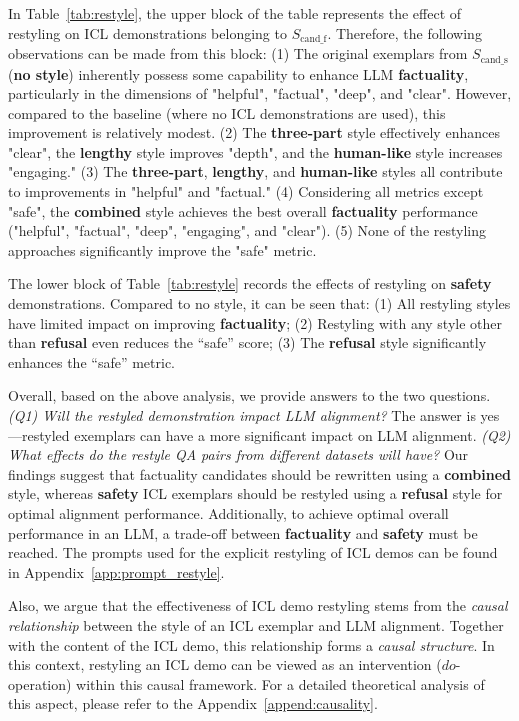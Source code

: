 In Table~\ref{tab:restyle}, the upper block of the table represents the effect of restyling on ICL demonstrations belonging to ${S_\text{cand\_f}}$. 
Therefore, the following observations can be made from this block: 
(1) The original exemplars from ${S_\text{cand\_s}}$ (\textbf{no style}) inherently possess some capability to enhance LLM \textbf{\color{myblue} factuality}, particularly in the dimensions of "helpful", "factual", "deep", and "clear". 
However, compared to the baseline (where no ICL demonstrations are used), this improvement is relatively modest.
(2) The \textbf{three-part} style effectively enhances "clear", the \textbf{lengthy} style improves "depth", and the \textbf{human-like} style increases "engaging."
(3) The \textbf{three-part}, \textbf{lengthy}, and \textbf{human-like} styles all contribute to improvements in "helpful" and "factual."
(4) Considering all metrics except "safe", the \textbf{combined} style achieves the best overall \textbf{\color{myblue} factuality} performance ("helpful", "factual", "deep", "engaging", and "clear").
(5) None of the restyling approaches significantly improve the "safe" metric.

The lower block of Table~\ref{tab:restyle} records the effects of restyling on \textbf{\color{myred} safety} demonstrations. Compared to no style, it can be seen that: (1) All restyling styles have limited impact on improving \textbf{\color{myblue} factuality}; (2) Restyling with any style other than \textbf{refusal} even reduces the “safe” score; (3) The \textbf{refusal} style significantly enhances the “safe” metric.

Overall, based on the above analysis, we provide answers to the two questions.
\emph{(Q1) Will the restyled demonstration impact LLM alignment?}
The answer is yes—restyled exemplars can have a more significant impact on LLM alignment.
\emph{(Q2) What effects do the restyle QA pairs from different datasets will have?}
Our findings suggest that factuality candidates should be rewritten using a \textbf{combined} style, whereas \textbf{\color{myred} safety} ICL exemplars should be restyled using a \textbf{refusal} style for optimal alignment performance.
Additionally, to achieve optimal overall performance in an LLM, a trade-off between \textbf{\color{myblue} factuality} and \textbf{\color{myred} safety} must be reached. 
The prompts used for the explicit restyling of ICL demos can be found in Appendix~\ref{app:prompt_restyle}.

Also, we argue that the effectiveness of ICL demo restyling stems from the \textit{causal relationship} between the style of an ICL exemplar and LLM alignment. 
Together with the content of the ICL demo, this relationship forms a \textit{causal structure}. In this context, restyling an ICL demo can be viewed as an intervention ($do$-operation) within this causal framework.
For a detailed theoretical analysis of this aspect, please refer to the Appendix~\ref{append:causality}.

